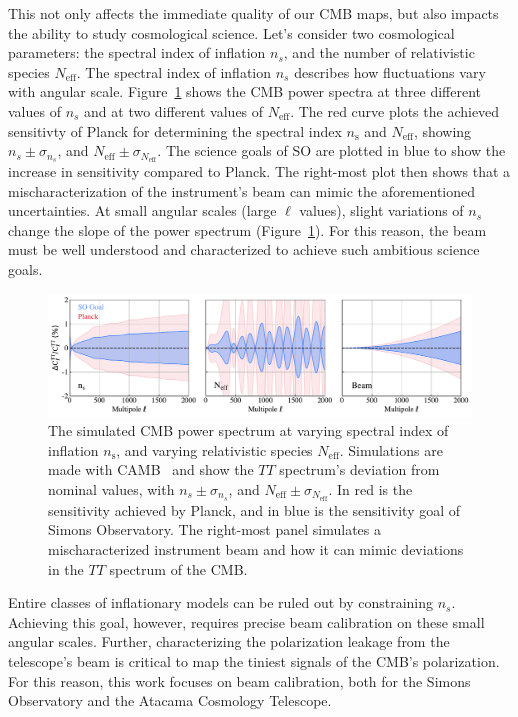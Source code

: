 This not only affects the immediate quality of our CMB maps, but also impacts the ability to study cosmological science.  Let's consider two cosmological parameters: the spectral index of inflation $n_{s}$, and the number of relativistic species $N_{\text{eff}}$.  The spectral index of inflation $n_{s}$ describes how fluctuations vary with angular scale.  Figure~\ref{fig:cmb_ns} shows the CMB power spectra at three different values of $n_{s}$ and at two different values of $N_{\text{eff}}$.
The red curve plots the achieved sensitivty of Planck for determining the spectral index $n_\text{s}$ and $N_{\text{eff}}$, showing $n_s\pm\sigma_{n_s}$, and $N_{\text{eff}}\pm\sigma_{N_{\text{eff}}}$.  The science goals of SO are plotted in blue to show the increase in sensitivity compared to Planck.  The right-most plot then shows that a mischaracterization of the instrument's beam can mimic the aforementioned uncertainties.  At small angular scales (large $\ell$ values), slight variations of $n_{s}$ change the slope of the power spectrum (Figure~\ref{fig:cmb_ns}).  For this reason, the beam must be well understood and characterized to achieve such ambitious science goals.

\begin{figure}[t!]
    \centering
    \includegraphics[width = \textwidth]{Figures/beam_neff.pdf}
    \caption{The simulated CMB power spectrum at varying spectral index of inflation $n_\text{s}$, and varying relativistic species $N_{\text{eff}}$.  Simulations are made with CAMB~\cite{camb_online} and show the $TT$ spectrum's deviation from nominal values, with $n_s\pm\sigma_{n_s}$, and $N_{\text{eff}}\pm\sigma_{N_{\text{eff}}}$.  In red is the sensitivity achieved by Planck, and in blue is the sensitivity goal of Simons Observatory.  The right-most panel simulates a mischaracterized instrument beam and how it can mimic deviations in the $TT$ spectrum of the CMB.}
    \label{fig:cmb_ns}
\end{figure}

Entire classes of inflationary models can be ruled out by constraining $n_{s}$.  Achieving this goal, however, requires precise beam calibration on these small angular scales.  Further, characterizing the polarization leakage from the telescope's beam is critical to map the tiniest signals of the CMB's polarization.  For this reason, this work focuses on beam calibration, both for the Simons Observatory and the Atacama Cosmology Telescope.

